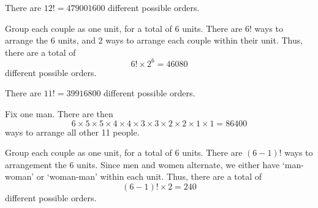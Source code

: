 \begin{solution}
    \begin{ppart}
        \begin{psubpart}
            There are $12! = 479001600$ different possible orders.
        \end{psubpart}
        \begin{psubpart}
            Group each couple as one unit, for a total of 6 units. There are $6!$ ways to arrange the 6 units, and 2 ways to arrange each couple within their unit. Thus, there are a total of \[6! \times 2^6 = 46080\] different possible orders.
        \end{psubpart}
    \end{ppart}
    \begin{ppart}
        \begin{psubpart}
            There are $11! = 39916800$ different possible orders.
        \end{psubpart}
        \begin{psubpart}
            Fix one man. There are then \[6 \times 5 \times 5 \times 4 \times 4 \times 3 \times 3 \times 2 \times 2 \times 1 \times 1 = 86400\] ways to arrange all other 11 people.
        \end{psubpart}
        \begin{psubpart}
            Group each couple as one unit, for a total of 6 units. There are $(6-1)!$ ways to arrangement the 6 units. Since men and women alternate, we either have `man-woman' or `woman-man' within each unit. Thus, there are a total of \[(6-1)! \times 2 = 240\] different possible orders.
        \end{psubpart}
    \end{ppart}
\end{solution}

